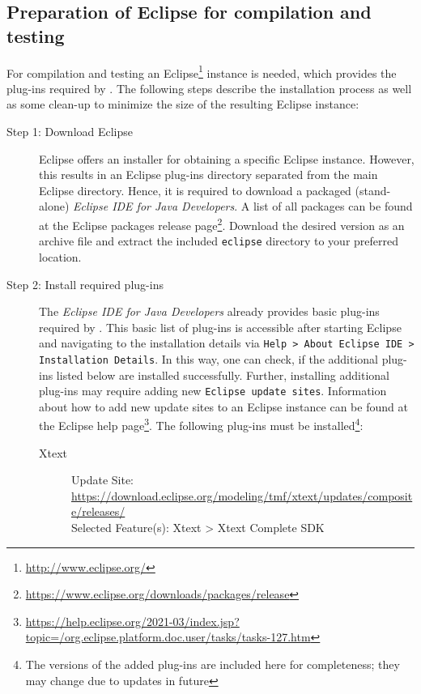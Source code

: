 \subsection{Preparation of Eclipse for compilation and testing}
\label{sec:Preparation of Eclipse}
For compilation and testing an Eclipse\footnote{\url{http://www.eclipse.org/}} instance is needed, which provides the plug-ins required by \EASy. The following steps describe the installation process as well as some clean-up to minimize the size of the resulting Eclipse instance:
\begin{description}
	\item[Step 1: Download Eclipse] $ $\\
		Eclipse offers an installer for obtaining a specific Eclipse instance. However, this results in an Eclipse plug-ins directory separated from the main Eclipse directory. Hence, it is required to download a packaged (stand-alone) \textit{Eclipse IDE for Java Developers}. A list of all packages can be found at the Eclipse packages release page\footnote{\url{https://www.eclipse.org/downloads/packages/release}}. Download the desired version as an archive file and extract the included \texttt{eclipse} directory to your preferred location.
	\item[Step 2: Install required plug-ins] $ $\\
		The \textit{Eclipse IDE for Java Developers} already provides basic plug-ins required by \EASy. This basic list of plug-ins is accessible after starting Eclipse and navigating to the installation details via \texttt{Help > About Eclipse IDE > Installation Details}. In this way, one can check, if the additional plug-ins listed below are installed successfully. Further, installing additional plug-ins may require adding new \texttt{Eclipse update sites}. Information about how to add new update sites to an Eclipse instance can be found at the Eclipse help page\footnote{\url{https://help.eclipse.org/2021-03/index.jsp?topic=/org.eclipse.platform.doc.user/tasks/tasks-127.htm}}. The following plug-ins must be installed\footnote{The versions of the added plug-ins are included here for completeness; they may change due to updates in future}:
		\begin{description}
			\item[Xtext] $ $\\
			Update Site: \url{https://download.eclipse.org/modeling/tmf/xtext/updates/composite/releases/} \\
			Selected Feature(s): Xtext > Xtext Complete SDK \\

\end{description}
\end{description}
